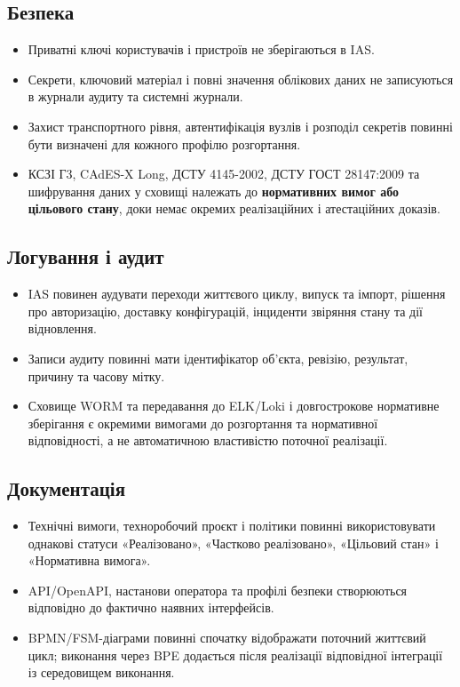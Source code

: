 \documentclass{article}
\begin{document}
\subsection{Безпека}
\begin{itemize}
  \item Приватні ключі користувачів і пристроїв не зберігаються в IAS.
  \item Секрети, ключовий матеріал і повні значення облікових даних не записуються в журнали аудиту та системні журнали.
  \item Захист транспортного рівня, автентифікація вузлів і розподіл секретів повинні бути визначені для кожного профілю розгортання.
  \item КСЗІ Г3, CAdES-X Long, ДСТУ 4145-2002, ДСТУ ГОСТ 28147:2009 та шифрування даних у сховищі належать до \textbf{нормативних вимог або цільового стану}, доки немає окремих реалізаційних і атестаційних доказів.
\end{itemize}

\subsection{Логування і аудит}
\begin{itemize}
  \item IAS повинен аудувати переходи життєвого циклу, випуск та імпорт, рішення про авторизацію, доставку конфігурацій, інциденти звіряння стану та дії відновлення.
  \item Записи аудиту повинні мати ідентифікатор об'єкта, ревізію, результат, причину та часову мітку.
  \item Сховище WORM та передавання до ELK/Loki і довгострокове нормативне зберігання є окремими вимогами до розгортання та нормативної відповідності, а не автоматичною властивістю поточної реалізації.
\end{itemize}

\subsection{Документація}
\begin{itemize}
  \item Технічні вимоги, техноробочий проєкт і політики повинні використовувати однакові статуси «Реалізовано», «Частково реалізовано», «Цільовий стан» і «Нормативна вимога».
  \item API/OpenAPI, настанови оператора та профілі безпеки створюються відповідно до фактично наявних інтерфейсів.
  \item BPMN/FSM-діаграми повинні спочатку відображати поточний життєвий цикл; виконання через BPE додається після реалізації відповідної інтеграції із середовищем виконання.
\end{itemize}
\end{document}
